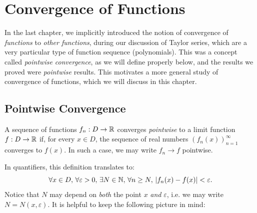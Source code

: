 \documentclass[../analysis1.tex]{subfiles}
\begin{document}
\chapter{Convergence of Functions}

In the last chapter, we implicitly introduced the notion of convergence of \textit{functions} to \textit{other functions}, during our discussion of Taylor series, which are a very particular type of function sequence (polynomials). This was a concept called \textit{pointwise convergence}, as we will define properly below, and the results we proved were \textit{pointwise} results. This motivates a more general study of convergence of functions, which we will discuss in this chapter.

\section{Pointwise Convergence}

\begin{definition}
    \begin{shaded*}
        A sequence of functions $f_n: D \to \mathbb{R}$ converges \textit{pointwise} to a limit function $f : D \to \mathbb{R}$ if, for every $x \in D$, the sequence of real numbers $(f_n(x))_{n=1}^\infty$ converges to $f(x)$.
        In such a case, we may write $f_n\to f$ pointwise.
        
    \end{shaded*}
\end{definition}
\begin{remark}
    In quantifiers, this definition translates to:
    \[\forall x \in D,\,\forall \varepsilon > 0,\, \exists N\in\mathbb{N},\, \forall n \ge N,\, |f_n(x) - f(x)| < \varepsilon.\]
    Notice that $N$ may depend on \textit{both} the point $x$ \textit{and} $\varepsilon$, i.e. we may write $N=N(x,\varepsilon)$. It is helpful to keep the following picture in mind:
\end{remark}
\end{document}
